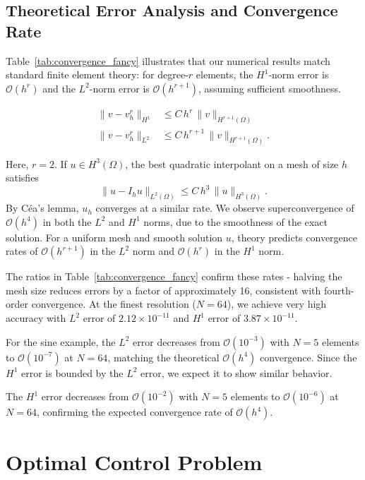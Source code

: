 \documentclass[a4paper,10pt]{article}
\begin{document}
\subsection{Theoretical Error Analysis and Convergence Rate}
Table~\ref{tab:convergence_fancy} illustrates that our numerical results match
standard finite element theory: for degree-$r$ elements, the $H^1$-norm error is
$\mathcal{O}(h^r)$ and the $L^2$-norm error is $\mathcal{O}(h^{r+1})$, assuming
sufficient smoothness.

\begin{align*}
	\|v - v_h^r\|_{H^1} & \le C\,h^{r}\,\|v\|_{H^{r+1}(\Omega)}    \\
	\|v - v_h^r\|_{L^2} & \le C\,h^{r+1}\,\|v\|_{H^{r+1}(\Omega)}.
\end{align*}

Here, $r=2$. If $u \in H^3(\Omega)$, the best quadratic interpolant on a mesh
of size $h$ satisfies
\[
	\|u - I_h u\|_{L^2(\Omega)} \le C\,h^{3}\,\|u\|_{H^3(\Omega)}.
\]
By Céa's lemma, $u_h$ converges at a similar rate\cite{Curry2018}.
We observe superconvergence of $\mathcal{O}(h^4)$ in both the $L^2$ and $H^1$ norms, due to the smoothness of the exact solution.
For a uniform mesh and smooth solution $u$, theory predicts convergence rates of $\mathcal{O}(h^{r+1})$ in the $L^2$ norm and $\mathcal{O}(h^r)$ in the $H^1$ norm.

The ratios in Table~\ref{tab:convergence_fancy} confirm these rates - halving the mesh size reduces errors by a factor of approximately 16, consistent with fourth-order convergence. At the finest resolution ($N=64$), we achieve very high accuracy with $L^2$ error of $2.12 \times 10^{-11}$ and $H^1$ error of $3.87 \times 10^{-11}$.

For the sine example, the $L^2$ error decreases from $\mathcal{O}(10^{-3})$ with $N=5$ elements to $\mathcal{O}(10^{-7})$ at $N=64$, matching the theoretical $\mathcal{O}(h^4)$ convergence.
Since the $H^1$ error is bounded by the $L^2$ error, we expect it to show similar behavior.

The $H^1$ error decreases from $\mathcal{O}(10^{-2})$ with $N=5$ elements to $\mathcal{O}(10^{-6})$ at $N=64$, confirming the expected convergence rate of $\mathcal{O}(h^4)$.

\section{Optimal Control Problem}
\label{sec:optimal_control}
\end{document}
